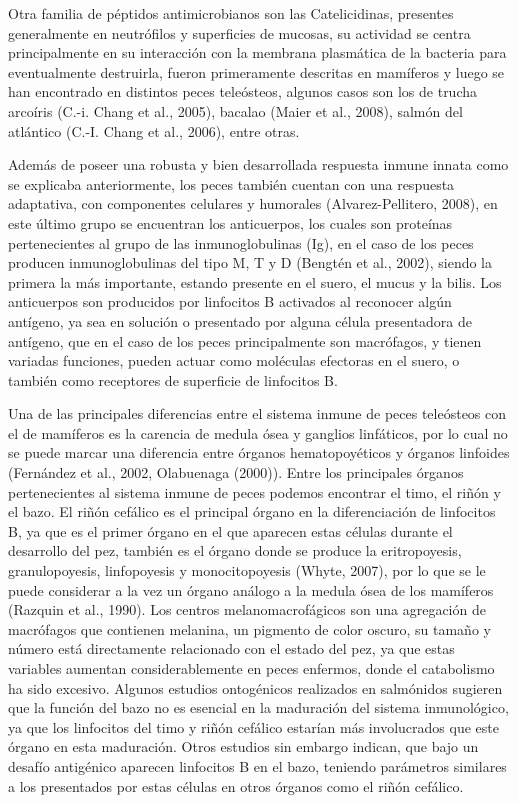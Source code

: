 \documentclass[11pt,a4paper,]{article}
\begin{document}
Otra familia de péptidos antimicrobianos son las Catelicidinas,
presentes generalmente en neutrófilos y superficies de mucosas, su
actividad se centra principalmente en su interacción con la membrana
plasmática de la bacteria para eventualmente destruirla, fueron
primeramente descritas en mamíferos y luego se han encontrado en
distintos peces teleósteos, algunos casos son los de trucha arcoíris
(C.-i. Chang et al., 2005)⁠, bacalao (Maier et al., 2008), salmón del
atlántico (C.-I. Chang et al., 2006), entre otras.

Además de poseer una robusta y bien desarrollada respuesta inmune innata
como se explicaba anteriormente, los peces también cuentan con una
respuesta adaptativa, con componentes celulares y humorales
(Alvarez-Pellitero, 2008)⁠, en este último grupo se encuentran los
anticuerpos, los cuales son proteínas pertenecientes al grupo de las
inmunoglobulinas (Ig), en el caso de los peces producen inmunoglobulinas
del tipo M, T y D (Bengtén et al., 2002)⁠, siendo la primera la más
importante, estando presente en el suero, el mucus y la bilis. Los
anticuerpos son producidos por linfocitos B activados al reconocer algún
antígeno, ya sea en solución o presentado por alguna célula presentadora
de antígeno, que en el caso de los peces principalmente son macrófagos,
y tienen variadas funciones, pueden actuar como moléculas efectoras en
el suero, o también como receptores de superficie de linfocitos B.

Una de las principales diferencias entre el sistema inmune de peces
teleósteos con el de mamíferos es la carencia de medula ósea y ganglios
linfáticos, por lo cual no se puede marcar una diferencia entre órganos
hematopoyéticos y órganos linfoides (Fernández et al., 2002, Olabuenaga
(2000))⁠. Entre los principales órganos pertenecientes al sistema inmune
de peces podemos encontrar el timo, el riñón y el bazo. El riñón
cefálico es el principal órgano en la diferenciación de linfocitos B, ya
que es el primer órgano en el que aparecen estas células durante el
desarrollo del pez, también es el órgano donde se produce la
eritropoyesis, granulopoyesis, linfopoyesis y monocitopoyesis (Whyte,
2007), por lo que se le puede considerar a la vez un órgano análogo a la
medula ósea de los mamíferos (Razquin et al., 1990)⁠. Los centros
melanomacrofágicos son una agregación de macrófagos que contienen
melanina, un pigmento de color oscuro, su tamaño y número está
directamente relacionado con el estado del pez, ya que estas variables
aumentan considerablemente en peces enfermos, donde el catabolismo ha
sido excesivo. Algunos estudios ontogénicos realizados en salmónidos
sugieren que la función del bazo no es esencial en la maduración del
sistema inmunológico, ya que los linfocitos del timo y riñón cefálico
estarían más involucrados que este órgano en esta maduración. Otros
estudios sin embargo indican, que bajo un desafío antigénico aparecen
linfocitos B en el bazo, teniendo parámetros similares a los presentados
por estas células en otros órganos como el riñón cefálico.
\end{document}
